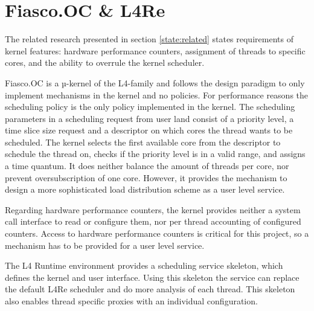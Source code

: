 \section{Fiasco.OC \& L4Re}
\label{state:env}
The related research presented in section \ref{state:related} states
requirements of kernel features:
hardware performance counters, assignment of threads to specific
cores, and the ability to overrule the kernel scheduler.

Fiasco.OC is a µ-kernel of the L4-family and follows the design paradigm to
only implement mechanisms in the kernel and no policies.
For performance reasons the scheduling policy is the only policy implemented in
the kernel.
The scheduling parameters in a scheduling request from user land consist of
a priority level, a time slice size request and a descriptor on which cores the
thread wants to be scheduled.
The kernel selects the first available core from the descriptor to schedule the
thread on, checks if the priority level is in a valid range, and assigns a time
quantum.
It does neither balance the amount of threads per core, nor prevent
oversubscription of one core.
However, it provides the mechanism to design a more sophisticated load
distribution scheme as a user level service.

Regarding hardware performance counters, the kernel provides neither a system
call interface to read or configure them, nor per thread accounting of
configured counters.
Access to hardware performance counters is critical for this project, so a
mechanism has to be provided for a user level service.

The L4 Runtime environment provides a scheduling service skeleton, which
defines the kernel and user interface.
Using this skeleton the service can replace the default L4Re scheduler and do
more analysis of each thread.
This skeleton also enables thread specific proxies with an individual
configuration.


